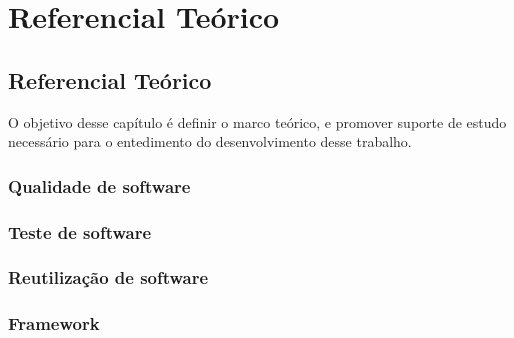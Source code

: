 \part{Referencial Teórico}

\chapter[Referencial Teorico]{Referencial Teórico}

O objetivo desse capítulo é definir o marco teórico, e promover suporte de estudo necessário para o entedimento do desenvolvimento desse trabalho.

\section{Qualidade de software}
\label{qualidade_de_software}
\section{Teste de software}
\label{teste_de_software/teste_de_sistema}
\section{Reutilização de software}
\label{reutilizacao}
\section{Framework}
\label{framework}

